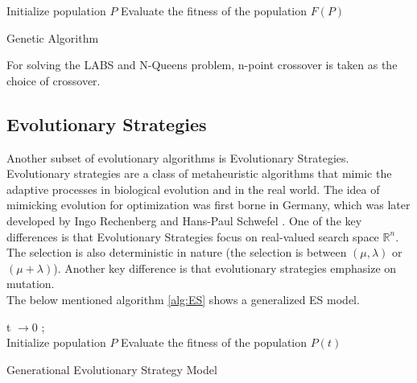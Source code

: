 \documentclass{article}
\begin{document}
\begin{algorithm}[H]
\SetAlgoLined
{}

\BlankLine
Initialize population $P$\;
Evaluate the fitness of the population $F(P)$\;
\caption{Genetic Algorithm}\label{alg:GA}
\end{algorithm}
For solving the LABS and N-Queens problem,  n-point crossover is taken as the choice of crossover. 
\subsection{Evolutionary Strategies}
Another subset of evolutionary algorithms is Evolutionary Strategies. Evolutionary strategies are a class of metaheuristic algorithms that mimic the adaptive processes in biological evolution and in the real world. The idea of mimicking evolution for optimization was first borne in Germany, which was later developed by Ingo Rechenberg \cite{source_evo1} and Hans-Paul Schwefel \cite{source-evo2}. One of the key differences is that Evolutionary Strategies focus on real-valued search space $\mathbb{R}^n$. The selection is also deterministic in nature (the selection is between $(\mu, \lambda)$ or  $(\mu + \lambda)$). Another key difference is that evolutionary strategies emphasize on mutation. \\
The below mentioned algorithm \ref{alg:ES} shows a generalized ES model. \\
\begin{algorithm}[H]
\SetAlgoLined
{}
\BlankLine
 t $\rightarrow 0 $ ;\\
Initialize population $P$\;
Evaluate the fitness of the population $P(t)$\;
\caption{Generational Evolutionary Strategy Model}\label{alg:ES}
\end{algorithm}
\end{document}
